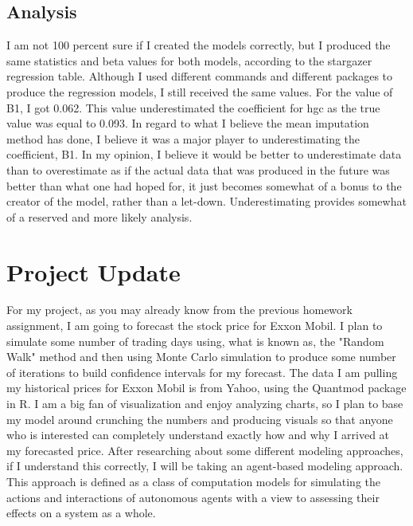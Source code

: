 \documentclass{article}
\begin{document}
\subsection{Analysis}
I am not 100 percent sure if I created the models correctly, but I produced the same statistics and beta values for both models, according to the stargazer regression table. Although I used different commands and different packages to produce the regression models, I still received the same values. For the value of B1, I got 0.062. This value underestimated the coefficient for hgc as the true value was equal to 0.093. In regard to what I believe the mean imputation method has done, I believe it was a major player to underestimating the coefficient, B1. In my opinion, I believe it would be better to underestimate data than to overestimate as if the actual data that was produced in the future was better than what one had hoped for, it just becomes somewhat of a bonus to the creator of the model, rather than a let-down. Underestimating provides somewhat of a reserved and more likely analysis.

\section{Project Update}
For my project, as you may already know from the previous homework assignment, I am going to forecast the stock price for Exxon Mobil. I plan to simulate some number of trading days using, what is known as, the "Random Walk" method and then using Monte Carlo simulation to produce some number of iterations to build confidence intervals for my forecast. The data I am pulling my historical prices for Exxon Mobil is from Yahoo, using the Quantmod package in R. I am a big fan of visualization and enjoy analyzing charts, so I plan to base my model around crunching the numbers and producing visuals so that anyone who is interested can completely understand exactly how and why I arrived at my forecasted price. After researching about some different modeling approaches, if I understand this correctly, I will be taking an agent-based modeling approach. This approach is defined as a class of computation models for simulating the actions and interactions of autonomous agents with a view to assessing their effects on a system as a whole.
\end{document}
